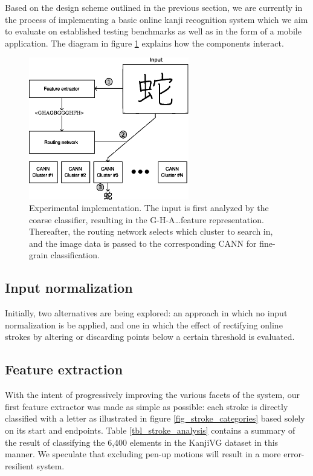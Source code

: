 \documentclass[10pt,conference,a4paper]{IEEEtran}
\begin{document}
	Based on the design scheme outlined in the previous section, we are currently in the process of implementing 
	a basic online kanji recognition system which we aim to evaluate on established testing benchmarks
	as well as in the form of a mobile application. The diagram in figure \ref{fig_experimental_implementation} 
	explains how the components interact.

	\begin{figure}
		\centering
		\includegraphics[width=2.75in]{./fig/experimental-implementation.eps}
		\caption{Experimental implementation. The input is first analyzed by the coarse classifier, resulting in the G-H-A\ldots feature representation.
		Thereafter, the routing network selects which cluster to search in, and the image data is passed to the corresponding CANN for fine-grain classification.}
		\label{fig_experimental_implementation}
	\end{figure}


	\subsection{Input normalization}

	Initially, two alternatives are being explored: an approach in which no input normalization is be applied, and one 
	in which the effect of rectifying online strokes by altering or discarding points below a certain threshold is evaluated.


	\subsection{Feature extraction}

	With the intent of progressively improving the various facets of the system,
	our first feature extractor was made as simple as possible: each stroke is directly
	classified with a letter as illustrated in figure \ref{fig_stroke_categories} based solely
	on its start and endpoints. Table \ref{tbl_stroke_analysis} contains a summary of the
	result of classifying the 6,400 elements in the KanjiVG dataset in this manner.
	We speculate that excluding pen-up motions will result in a more error-resilient system.
\end{document}
